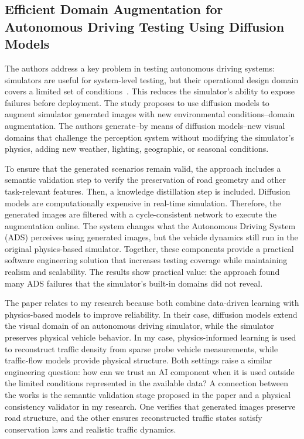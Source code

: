\documentclass{article}
\begin{document}
\subsection{Efficient Domain Augmentation for Autonomous Driving Testing Using Diffusion Models}

The authors address a key problem in testing autonomous driving systems: simulators are useful for system-level testing, but their operational design domain covers a limited set of conditions~\cite{Baresi2025}. 
This reduces the simulator's ability to expose failures before deployment. 
The study proposes to use diffusion models to augment simulator generated images with new environmental conditions--domain augmentation. 
The authors generate--by means of diffusion models--new visual domains that challenge the perception system without modifying the simulator's physics, adding new weather, lighting, geographic, or seasonal conditions. 

To ensure that the generated scenarios remain valid, the approach includes a semantic validation step to verify the preservation of road geometry and other task-relevant features. 
Then, a knowledge distillation step is included. 
Diffusion models are computationally expensive in real-time simulation. 
Therefore, the generated images are filtered with a cycle-consistent network to execute the augmentation online. 
The system changes what the Autonomous Driving System (ADS) perceives using generated images, but the vehicle dynamics still run in the original physics-based simulator. 
Together, these components provide a practical software engineering solution that increases testing coverage while maintaining realism and scalability.
The results show practical value: the approach found many ADS failures that the simulator’s built-in domains did not reveal.

The paper relates to my research because both combine data-driven learning with physics-based models to improve reliability. 
In their case, diffusion models extend the visual domain of an autonomous driving simulator, while the simulator preserves physical vehicle behavior. 
In my case, physics-informed learning is used to reconstruct traffic density from sparse probe vehicle measurements, while traffic-flow models provide physical structure. 
Both settings raise a similar engineering question: how can we trust an AI component when it is used outside the limited conditions represented in the available data?
A connection between the works is the semantic validation stage proposed in the paper and a physical consistency validator in my research. 
One verifies that generated images preserve road structure, and the other ensures reconstructed traffic states satisfy conservation laws and realistic traffic dynamics.
\end{document}
